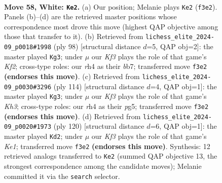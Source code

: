\documentclass[11pt]{article}
\begin{document}
\clearpage

\begin{figure}[p]\centering
\begin{subfigure}{0.46\textwidth}\centering
\resizebox{\linewidth}{!}{%
\newchessgame
\chessboard[
  setfen={8/p2p4/2p2k2/8/7r/5K2/8/8 w - - 2 58},
  showmover=false,
  pgfstyle=straightmove, color=movearrow, markmove={f3-e2}
]}
\caption{}
\end{subfigure}\hfill
\begin{subfigure}{0.46\textwidth}\centering
\resizebox{\linewidth}{!}{%
\newchessgame
\chessboard[
  setfen={8/1b5p/1P2k1p1/8/8/8/5K2/8 w - - 3 50},
  showmover=false,
  pgfstyle=straightmove, color=movearrow, markmove={f2-g3}
]}
\caption{}
\end{subfigure}
\\[4pt]
\begin{subfigure}{0.46\textwidth}\centering
\resizebox{\linewidth}{!}{%
\newchessgame
\chessboard[
  setfen={8/8/8/5pp1/4p3/7K/3k4/8 w - - 2 58},
  showmover=false,
  pgfstyle=straightmove, color=movearrow, markmove={h3-g3}
]}
\caption{}
\end{subfigure}\hfill
\begin{subfigure}{0.46\textwidth}\centering
\resizebox{\linewidth}{!}{%
\newchessgame
\chessboard[
  setfen={8/8/4p3/3p4/8/6k1/8/4K3 w - - 0 61},
  showmover=false,
  pgfstyle=straightmove, color=movearrow, markmove={e1-d2}
]}
\caption{}
\end{subfigure}
\caption{\textbf{Move 58, White: \texttt{Ke2}.} (a) Our position; Melanie plays \texttt{Ke2} (\texttt{f3e2}). Panels (b)--(d) are the retrieved master positions whose correspondence most drove this move (highest QAP objective among those that transfer to it). (b) Retrieved from \texttt{lichess\_elite\_2024-09\_p0018\#1998} (ply 98) [structural distance $d$=5, QAP obj=2]: the master played \texttt{Kg3}; under $\mu$ our \emph{Kf3} plays the role of that game's \emph{Kf2}; cross-type roles: our \emph{r}h4 as their \emph{b}b7; transferred move \texttt{f3e2} \textbf{(endorses this move)}. (c) Retrieved from \texttt{lichess\_elite\_2024-09\_p0030\#3296} (ply 114) [structural distance $d$=4, QAP obj=1]: the master played \texttt{Kg3}; under $\mu$ our \emph{Kf3} plays the role of that game's \emph{Kh3}; cross-type roles: our \emph{r}h4 as their \emph{p}g5; transferred move \texttt{f3e2} \textbf{(endorses this move)}. (d) Retrieved from \texttt{lichess\_elite\_2024-09\_p0020\#1973} (ply 120) [structural distance $d$=6, QAP obj=1]: the master played \texttt{Kd2}; under $\mu$ our \emph{Kf3} plays the role of that game's \emph{Ke1}; transferred move \texttt{f3e2} \textbf{(endorses this move)}. Synthesis: 12 retrieved analogs transferred to \texttt{Ke2} (summed QAP objective 13, the strongest correspondence among the candidate moves); Melanie committed it via the \texttt{search} selector.}
\label{fig:thought-m114}
\end{figure}
\end{document}
